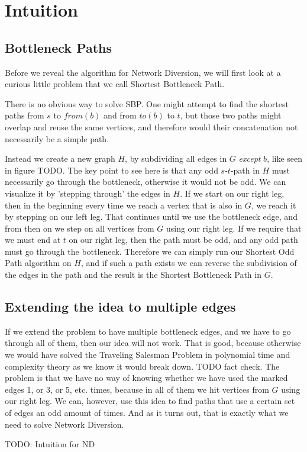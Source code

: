 \section{Intuition}
\subsection{Bottleneck Paths}
Before we reveal the algorithm for Network Diversion, we will first look at a curious little problem that we call Shortest Bottleneck Path.


There is no obvious way to solve SBP. One might attempt to find the shortest paths from $s$ to $from(b)$ and from $to(b)$ to $t$, but those two paths might overlap and reuse the same vertices, and therefore would their concatenation not necessarily be a simple path.

Instead we create a new graph $H$, by subdividing all edges in $G$ \emph{except} $b$, like seen in figure TODO. The key point to see here is that any odd $s$-$t$-path in $H$ must necessarily go through the bottleneck, otherwise it would not be odd. We can visualize it by 'stepping through' the edges in $H$. If we start on our right leg, then in the beginning every time we reach a vertex that is also in $G$, we reach it by stepping on our left leg. That continues until we use the bottleneck edge, and from then on we step on all vertices from $G$ using our right leg. If we require that we must end at $t$ on our right leg, then the path must be odd, and any odd path must go through the bottleneck. Therefore we can simply run our Shortest Odd Path algorithm on $H$, and if such a path exists we can reverse the subdivision of the edges in the path and the result is the Shortest Bottleneck Path in $G$.

\subsection{Extending the idea to multiple edges}
If we extend the problem to have multiple bottleneck edges, and we have to go through all of them, then our idea will not work. That is good, because otherwise we would have solved the Traveling Salesman Problem in polynomial time and complexity theory as we know it would break down. TODO fact check.
The problem is that we have no way of knowing whether we have used the marked edges 1, or 3, or 5, etc. times, because in all of them we hit vertices from $G$ using our right leg. We can, however, use this idea to find paths that use a certain set of edges an odd amount of times. And as it turns out, that is exactly what we need to solve Network Diversion.

TODO: Intuition for ND